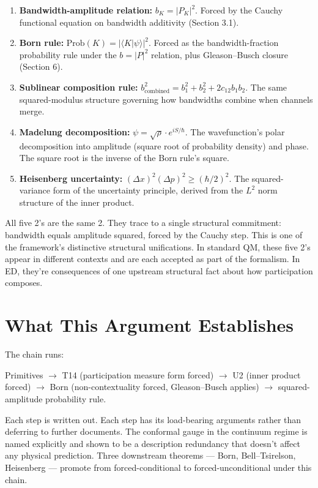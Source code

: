 \documentclass[11pt,a4paper]{article}
\begin{document}
\begin{enumerate}[noitemsep]
  \item \textbf{Bandwidth-amplitude relation:} $b_K = |P_K|^2$. Forced by the Cauchy functional equation on bandwidth additivity (Section 3.1).
  \item \textbf{Born rule:} $\mathrm{Prob}(K) = |\langle K|\psi\rangle|^2$. Forced as the bandwidth-fraction probability rule under the $b = |P|^2$ relation, plus Gleason--Busch closure (Section 6).
  \item \textbf{Sublinear composition rule:} $b^2_{\mathrm{combined}} = b^2_1 + b^2_2 + 2c_{12} b_1 b_2$. The same squared-modulus structure governing how bandwidths combine when channels merge.
  \item \textbf{Madelung decomposition:} $\psi = \sqrt{\rho}\cdot e^{iS/\hbar}$. The wavefunction's polar decomposition into amplitude (square root of probability density) and phase. The square root is the inverse of the Born rule's square.
  \item \textbf{Heisenberg uncertainty:} $(\Delta x)^2 (\Delta p)^2 \geq (\hbar/2)^2$. The squared-variance form of the uncertainty principle, derived from the $L^2$ norm structure of the inner product.
\end{enumerate}

All five 2's are the same 2. They trace to a single structural commitment: bandwidth equals amplitude squared, forced by the Cauchy step. This is one of the framework's distinctive structural unifications. In standard QM, these five 2's appear in different contexts and are each accepted as part of the formalism. In ED, they're consequences of one upstream structural fact about how participation composes.

\section{What This Argument Establishes}

The chain runs:

Primitives $\to$ T14 (participation measure form forced) $\to$ U2 (inner product forced) $\to$ Born (non-contextuality forced, Gleason--Busch applies) $\to$ squared-amplitude probability rule.

Each step is written out. Each step has its load-bearing arguments rather than deferring to further documents. The conformal gauge in the continuum regime is named explicitly and shown to be a description redundancy that doesn't affect any physical prediction. Three downstream theorems --- Born, Bell--Tsirelson, Heisenberg --- promote from forced-conditional to forced-unconditional under this chain.
\end{document}
